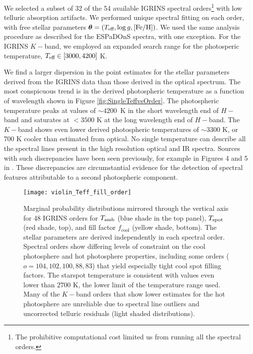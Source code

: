\documentclass[twocolumn]{emulateapj}%
\begin{document}
We selected a subset of 32 of the 54 available IGRINS spectral orders\footnote{The prohibitive computational cost limited us from running all the spectral orders.} with low telluric absorption artifacts.  We performed unique spectral fitting on each order, with free stellar parameters ${\bm \theta} = (T_\textrm{eff}, \log g, [{\rm Fe}/{\rm H}])$.  We used the same analysis procedure as described for the ESPaDOnS spectra, with one exception.  For the IGRINS $K-$band, we employed an expanded search range for the photosperic temperature, $T_\textrm{eff} \in [3000, 4200]$ K.

We find a larger dispersion in the point estimates for the stellar parameters derived from the IGRINS data than those derived in the optical spectrum.  The most conspicuous trend is in the derived photospheric temperature as a function of wavelength shown in Figure \ref{fig:SingleTeffvsOrder}.  The photospheric temperature peaks at values of $\sim4200$~K in the short wavelength end of $H-$band and saturates at $<3500$ K at the long wavelength end of $H-$band.  The $K-$band shows even lower derived photospheric temperatures of $\sim3300$ K, or 700 K cooler than estimated from optical.  No single temperature can describe all the spectral lines present in the high resolution optical and IR spectra.  
Sources with such discrepancies have been seen previously, for example in Figures 4 and 5 in \citet{bouvier92}.  These discrepancies are circumstantial evidence for the detection of spectral features attributable to a second photospheric component.


\begin{figure*}
 \centering
 \texttt{[image: violin\_Teff\_fill\_order]} 
 \caption{Marginal probability distributions mirrored through the vertical axis \citep[``Violin plot'']{waskom14} for 48 IGRINS orders for $T_\textrm{amb}$ (blue shade in the top panel), $T_\textrm{spot}$ (red shade, top), and fill factor $f_{\mathrm{cool}}$ (yellow shade, bottom).  The stellar parameters are derived independently in each spectral order.  Spectral orders show differing levels of constraint on the cool photosphere and hot photosphere properties, including some orders ($o=104, 102, 100, 88, 83$) that yield especially tight cool spot filling factors.  The starspot temperature is consistent with values even lower than 2700 K, the lower limit of the temperature range used.  Many of the $K-$band orders that show lower estimates for the hot photosphere are unreliable due to spectral line outliers and uncorrected telluric residuals (light shaded distributions).}
 \label{fig:TwoTempResults}
\end{figure*}
\end{document}
